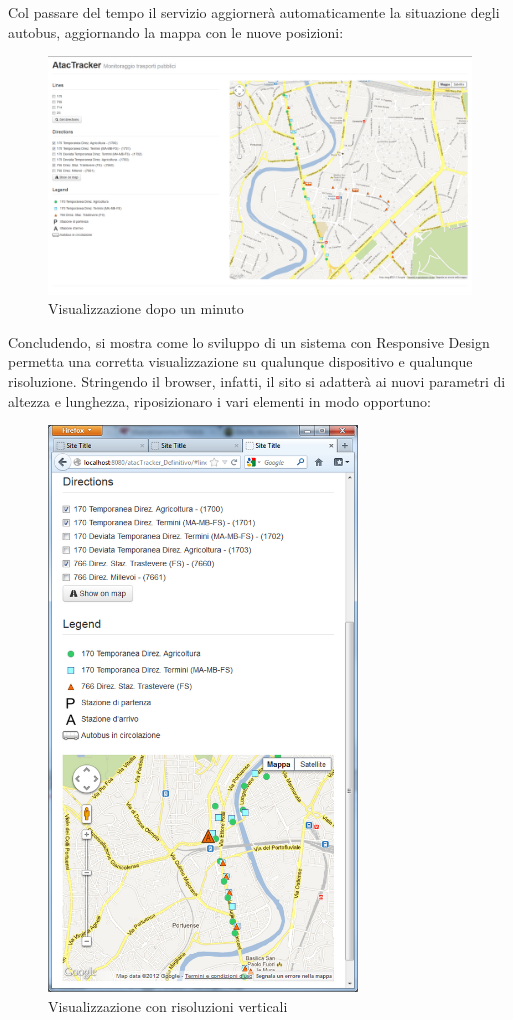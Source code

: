 Col passare del tempo il servizio aggiornerà automaticamente la situazione degli autobus, aggiornando la mappa con le nuove posizioni:

\begin{figure}[htbp]
\begin{center}
\includegraphics[width=13cm]{contents/images/bus2}
\end{center}
\caption{Visualizzazione dopo un minuto}
\label{fig:fermata}
\end{figure}
\newpage
Concludendo, si mostra come lo sviluppo di un sistema con Responsive Design permetta una corretta visualizzazione su qualunque dispositivo e qualunque risoluzione. Stringendo il browser, infatti, il sito si adatterà ai nuovi parametri di altezza e lunghezza, riposizionaro i vari elementi in modo opportuno:

\begin{figure}[htbp]
\begin{center}
\includegraphics[height=15cm]{contents/images/responsive}
\end{center}
\caption{Visualizzazione con risoluzioni verticali}
\label{fig:fermata}
\end{figure}
